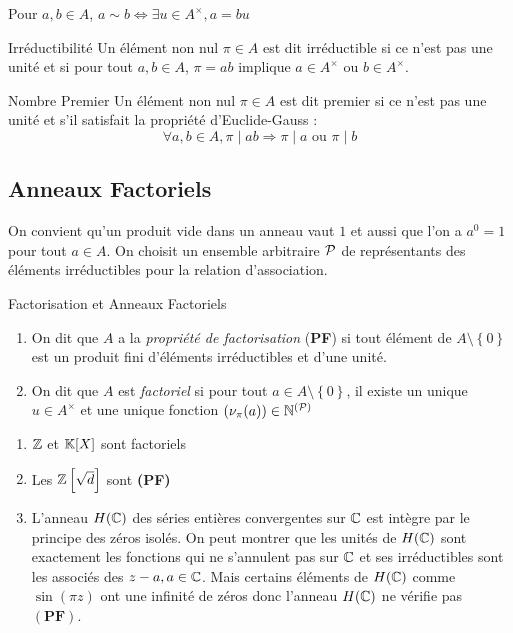 \documentclass{cours}
\begin{document}
\begin{lemma}
    Pour $a, b \in A$, $a \sim b \Leftrightarrow \exists u \in A^{\times}, a = bu$
\end{lemma}

\begin{définition}{Irréductibilité}{}
    Un élément non nul $\pi \in A$ est dit irréductible si ce n'est pas une unité et si pour tout $a, b \in A$, $\pi = ab$ implique $a \in A^{\times}$ ou $b\in A^{\times}$.
\end{définition}

\begin{définition}{Nombre Premier}{}
    Un élément non nul $\pi \in A$ est dit premier si ce n'est pas une unité et s'il satisfait la propriété d'Euclide-Gauss :
    \[
        \forall a,b \in A, \pi \mid ab \Longrightarrow \pi \mid a \text{ ou } \pi \mid b
    \]
\end{définition}

\subsection{Anneaux Factoriels}
\begin{définition}{}{}
    On convient qu'un produit vide dans un anneau vaut $1$ et aussi que l'on a $a^{0} = 1$ pour tout $a \in A$. On choisit un ensemble arbitraire $\mathcal{P}$ de représentants des éléments irréductibles pour la relation d'association.
\end{définition}

\begin{définition}{Factorisation et Anneaux Factoriels}{}
    \begin{enumerate}
        \item On dit que $A$ a la \emph{propriété de factorisation} (\textbf{PF}) si tout élément de $A\setminus \left\{0\right\}$ est un produit fini d'éléments irréductibles et d'une unité.
        \item On dit que $A$ est \emph{factoriel} si pour tout $a \in A\setminus \left\{0\right\}$, il existe un unique $u \in A^{\times}$ et une unique fonction $\left(\nu_{\pi}(a)\right) \in \mathbb{N}^{\left(\mathcal{P}\right)}$
    \end{enumerate}
\end{définition}

\begin{example}
    \begin{enumerate}
        \item $\mathbb{Z}$ et $\mathbb{K}[X]$ sont factoriels
        \item Les $\mathbb{Z}\left[\sqrt{d}\right]$ sont \textbf{(PF)}
        \item L'anneau $H(\mathbb{C})$ des séries entières convergentes sur $\mathbb{C}$ est intègre par le principe des zéros isolés. On peut montrer que les unités de $H(\mathbb{C})$ sont exactement les fonctions qui ne s'annulent pas sur $\mathbb{C}$ et ses irréductibles sont les associés des $z - a, a\in \mathbb{C}$. Mais certains éléments de $H(\mathbb{C})$ comme $\sin\left(\pi z\right)$ ont une infinité de zéros donc l'anneau $H(\mathbb{C})$ ne vérifie pas $\left(\textbf{PF}\right)$.
    \end{enumerate}
\end{example}
\end{document}
